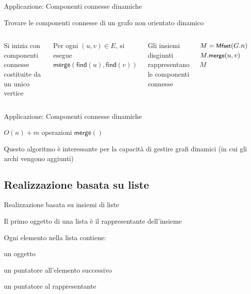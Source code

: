 \begin{frame}{Applicazione: Componenti connesse dinamiche}

\begin{myboxtitle}[Problema]
Trovare le componenti connesse di un grafo non orientato \alert{dinamico}
\end{myboxtitle}

\begin{columns}[T]
\BIL
\item Si inizia con componenti connesse costituite da un unico vertice
\item Per ogni $(u,v) \in E$, si esegue $\textsf{merge}(\textsf{find}(u), \textsf{find}(v))$ 
\item Gli insiemi disgiunti rappresentano
le componenti connesse
\EIL
{}
\vspace{-9pt}
\begin{Procedure}
\caption[A]{\mfset\ \connectedcomponents($\Graph\ G$)}

\mfset $M = \textsf{{\small Mfset}}(G.n)$\;
{
  {
    $M.\textsf{{\small merge}}(u, v)$\;
  }
}
\Return\ $M$\;
\end{Procedure}

\end{columns}

\end{frame}

\begin{frame}{Applicazione: Componenti connesse dinamiche}

\begin{myboxtitle}[Complessità]
\smallskip
$O(n) + m$ operazioni $\textsf{merge}()$
\end{myboxtitle}

\begin{myboxtitle}[Motivazione]
\smallskip
Questo algoritmo è interessante per la capacità di gestire grafi dinamici 
(in cui gli archi vengono aggiunti)
\end{myboxtitle}

\end{frame}

\subsection{Realizzazione basata su liste}


\begin{frame}{Realizzazione basata su insiemi di liste}

\BIL
\item Il primo oggetto di una lista è il rappresentante dell'insieme
\item Ogni elemento nella lista contiene:
  \BI
  \item un oggetto
  \item un puntatore all'elemento successivo
  \item un puntatore al rappresentante
  \EI
\EIL


\end{frame}


